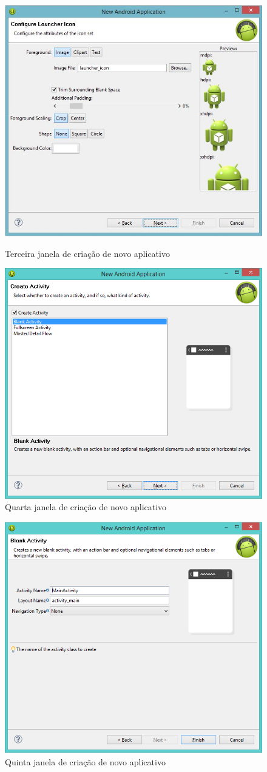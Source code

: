 \documentclass[a4paper,12pt,brazil,doubleside]{book}
\begin{document}
\begin{figure}[H]
  \centering
  \includegraphics[width=.8\textwidth]{figuras/2-criando-app.jpg}
  \caption{Terceira janela de criação de novo aplicativo}
  \label{fig:c}
   \includegraphics[width=.8\textwidth]{figuras/2-criando-app-4.png}
  \caption{Quarta janela de criação de novo aplicativo}
  \label{fig:c}
 \end{figure}
 \newpage
\begin{figure}[H]
  \centering
   \includegraphics[width=.8\textwidth]{figuras/2-criando-app-5.png}
  \caption{Quinta janela de criação de novo aplicativo}
  \label{fig:c}
\end{figure}
\end{document}
